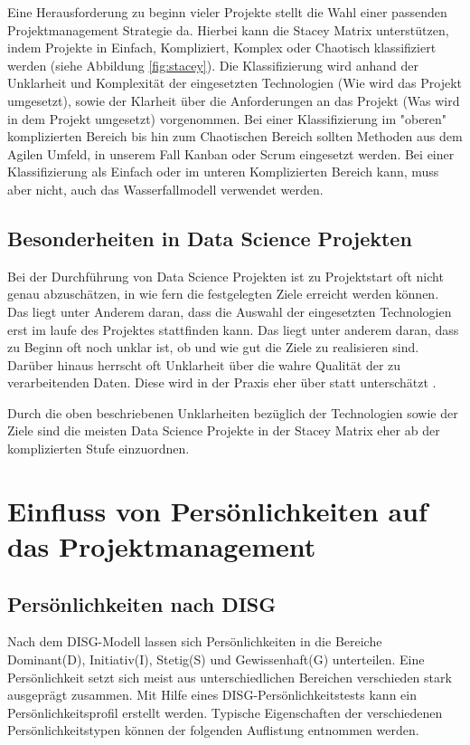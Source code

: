 \documentclass[twocolumn,10pt]{asme2ej}
\begin{document}
Eine Herausforderung zu beginn vieler Projekte stellt die Wahl einer passenden Projektmanagement Strategie da. Hierbei kann die Stacey Matrix \cite{Stacey2011StrategicMA} unterstützen, indem Projekte in Einfach, Kompliziert, Komplex oder Chaotisch klassifiziert werden (siehe Abbildung \ref{fig:stacey}). Die Klassifizierung wird anhand der Unklarheit und Komplexität der eingesetzten Technologien (Wie wird das Projekt umgesetzt), sowie der Klarheit über die Anforderungen an das Projekt (Was wird in dem Projekt umgesetzt) vorgenommen. Bei einer Klassifizierung im "oberen" komplizierten Bereich bis hin zum Chaotischen Bereich sollten Methoden aus dem Agilen Umfeld, in unserem Fall Kanban oder Scrum eingesetzt werden. Bei einer Klassifizierung als Einfach oder im unteren Komplizierten Bereich kann, muss aber nicht, auch das Wasserfallmodell verwendet werden.

\subsection{Besonderheiten in Data Science Projekten}\label{sec:1}

Bei der Durchführung von Data Science Projekten ist zu Projektstart oft nicht genau abzuschätzen, in wie fern die festgelegten Ziele erreicht werden können. Das liegt unter Anderem daran, dass die Auswahl der eingesetzten Technologien erst im laufe des Projektes stattfinden kann. Das liegt unter anderem daran, dass zu Beginn oft noch unklar ist, ob und wie gut die Ziele zu realisieren sind. Darüber hinaus herrscht oft Unklarheit über die wahre Qualität der zu verarbeitenden Daten. Diese wird in der Praxis eher über statt unterschätzt \cite{agile_pm}.

Durch die oben beschriebenen Unklarheiten bezüglich der Technologien sowie der Ziele sind die meisten Data Science Projekte in der Stacey Matrix eher ab der komplizierten Stufe einzuordnen.

\section{Einfluss von Persönlichkeiten auf das Projektmanagement}\label{sec:2}

\subsection{Persönlichkeiten nach DISG}
Nach dem DISG-Modell \cite{disc} lassen sich Persönlichkeiten in die Bereiche Dominant(D), Initiativ(I), Stetig(S) und Gewissenhaft(G) unterteilen. Eine Persönlichkeit setzt sich meist aus unterschiedlichen Bereichen verschieden stark ausgeprägt zusammen. Mit Hilfe eines DISG-Persönlichkeitstests kann ein Persönlichkeitsprofil erstellt werden. Typische Eigenschaften der verschiedenen Persönlichkeitstypen können der folgenden Auflistung entnommen werden.
\end{document}
